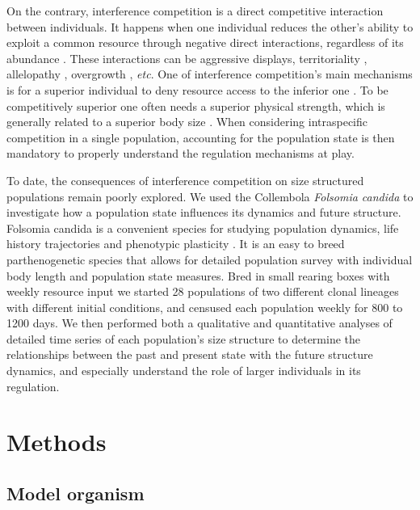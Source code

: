 On the contrary, interference competition is a direct competitive interaction
between individuals. It happens when one individual reduces the other’s ability
to exploit a common resource through negative direct interactions, regardless of
its abundance \autocites{park1954a,vance1984a}. These interactions can be
aggressive displays\autocites{schoener1976a}, territoriality
\autocites{walls1990a,kennedy1996a}, allelopathy
\autocites{harper1977a,rice1984a,nilsson1994a}, overgrowth
\autocites{connell1961a,paine1966a}, \textit{etc}. One of interference
competition's main mechanisms is for a superior individual to deny resource
access to the inferior one \autocites{schoener1983a,thompson1993a}. To be
competitively superior one often needs a superior physical strength, which is
generally related to a superior body size \autocites{mccormick2012a}.
When considering intraspecific competition in a single population, accounting
for the population state is then mandatory to properly understand the regulation
mechanisms at play.

To date, the consequences of interference competition on size structured
populations remain poorly explored. We used the Collembola \textit{Folsomia
candida} to investigate how a population state influences its dynamics and
future structure.
Folsomia candida is a convenient species for studying population dynamics, life
history trajectories and phenotypic plasticity
\autocites{tully2005a,tully2008a}.
It is an easy to breed parthenogenetic species \autocites{fountain2005a} that
allows for detailed population survey with individual body length and population
state measures.
Bred in small rearing boxes with weekly resource input \autocites{tully2008a} we
started 28 populations of two different clonal lineages with different initial
conditions, and censused each population weekly for 800 to 1200
days. We then performed both a qualitative and quantitative analyses of detailed
time series of each population’s size structure to determine the relationships
between the past and present state with the future structure dynamics, and
especially understand the role of larger individuals in its regulation.

\section{Methods}

\subsection{Model organism}

